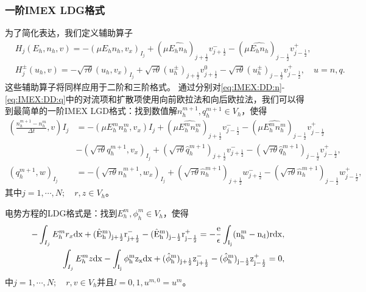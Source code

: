 \subsubsection{一阶IMEX LDG格式}
为了简化表达，我们定义辅助算子
\begin{align}
     & H_j(E_h,n_h,v)    = - (\mu E_h n_h, v_x)_{I_j} + (\mu \hat{E_h n_h})_{j+\frac{1}{2}}v_{j+\frac{1}{2}}^- - (\mu \hat{E_h n_h})_{j-\frac{1}{2}}v_{j-\frac{1}{2}}^+, \label{eq:IMEX:DD:notation:1}                                        \\
     & H_j^{\pm}(u_h,v)  =- \sqrt{\tau \theta}(u_h,v_x)_{I_j} + \sqrt{\tau\theta}(u_h^{\pm})_{j+\frac{1}{2}}v_{j+\frac{1}{2}}^0 - \sqrt{\tau\theta}(u_h^{\pm})_{j-\frac{1}{2}}v_{j-\frac{1}{2}}^+,\quad u = n,q.\label{eq:IMEX:DD:notation:2}
\end{align}
这些辅助算子将同样应用于二阶和三阶格式。
通过分别对\eqref{eq:IMEX:DD:n}-\eqref{eq:IMEX:DD:q}中的对流项和扩散项使用向前欧拉法和向后欧拉法，我们可以得到最简单的一阶IMEX LGD格式：找到数值解$n_h^{m+1},q_h^{m+1}\in V_h$，使得
\begin{align}
    (\frac{n_h^{m+1} - n_h^m}{\Delta t},v)I_j & = -(\mu E_h^mn_h^m, v_x)I_j + (\mu \hat{E_h^mn_h^m})_{j+\frac{1}{2}}v_{j-\frac{1}{2}}^- - (\mu\hat{E_h^mn_h^m})_{j-\frac{1}{2}}v^+_{j-\frac{1}{2}}                                         \nonumber                 \\
                                              & -(\sqrt{\tau \theta}q_h^{m+1},v_x)_{I_j} + (\sqrt{\tau \theta}\hat{q}_h^{m+1})_{j+\frac{1}{2}}v_{j+\frac{1}{2}}^- - (\sqrt{\tau \theta}\hat{q}_h^{m+1})_{j-\frac{1}{2}}v_{j-\frac{1}{2}}^+,  \label{eq:IMEX:1:first} \\
    (q_h^{m+1},w)_{I_j}                       & = -(\sqrt{\tau \theta}n_h^{m+1},w_x)_{I_j} + (\sqrt{\tau \theta}\hat{n}_h^{m+1})_{j+\frac{1}{2}}w_{j+\frac{1}{2}}^- - (\sqrt{\tau \theta}\hat{n}_h^{m+1})_{j-\frac{1}{2}}w_{j-\frac{1}{2}}^+,
\end{align}
其中$j = 1,\cdots,N;\quad r,z \in V_h$。

电势方程的LDG格式是：找到$E_h^{m},\phi_h^{m} \in V_h$，使得
\begin{align}
    -\int_{I_j} E_h^{m}r_x \rm{d}x + (\hat{E}_h^{m})_{j+\frac{1}{2}}r_{j+\frac{1}{2}}^- - (\hat{E}_h^{m})_{j-\frac{1}{2}}r_{j-\frac{1}{2}}^+ = -\frac{e}{\epsilon}\int_{I_j}(n_h^{m} - n_d) r\rm{d} x, \\
    \int_{I_j} E_h^{m}z \rm{d}x - \int_{I_j} \phi_h^{m}z_x \rm{d}x  + (\hat{\phi}_h^{m})_{j+\frac{1}{2}}z^-_{j+\frac{1}{2}} - (\hat{\phi}_h^{m})_{j-\frac{1}{2}}z_{j-\frac{1}{2}}^+  = 0,\label{eq:IMEX:1:last}
\end{align}
中$j = 1,\cdots,N;\quad r,v \in V_h$并且$l = 0,1, u^{m,0} = u^m$。
